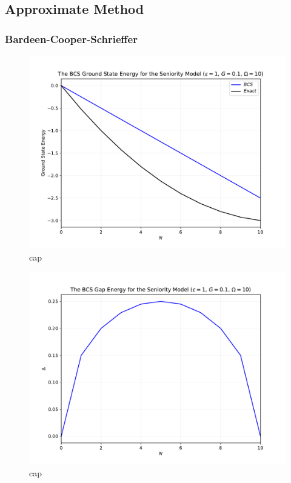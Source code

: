 \documentclass[prb,aps,twocolumn,showpacs,10pt]{revtex4-2}
\begin{document}
\subsection{Approximate Method}
\subsubsection{Bardeen-Cooper-Schrieffer}


\begin{figure}
  \includegraphics[width=\linewidth]{../figures/plot_bcs_energy.pdf}
  \caption{cap}
\end{figure}

\begin{figure}
  \includegraphics[width=\linewidth]{../figures/plot_bcs_gap.pdf}
  \caption{cap}
\end{figure}
\end{document}
